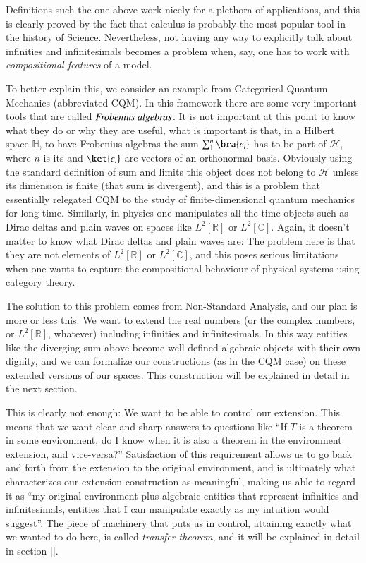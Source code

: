 \documentclass[adraft, copyright,creativecommons,sharealike,noncommercial]{eptcs}
\begin{document}
Definitions such the one above work nicely for a plethora of applications, and this is clearly proved by the fact that calculus is probably the most popular tool in the history of Science. Nevertheless, not having any way to explicitly talk about infinities and infinitesimals becomes a problem when, say, one has to work with \emph{compositional features} of a model. 

To better explain this, we consider an example from Categorical Quantum Mechanics (abbreviated CQM). In this framework there are some very important tools that are called $\emph{Frobenius algebras}$. It is not important at this point to know what they do or why they are useful, what is important is that, in a Hilbert space $\mathbb{H}$, to have Frobenius algebras the sum $\sum_1^n \bra{e_i}$ has to be part of $\mathcal{H}$, where $n$ is its and $\ket{e_i}$ are vectors of an orthonormal basis. Obviously using the standard definition of sum and limits this object does not belong to $\mathcal{H}$ unless its dimension is finite (that sum is divergent), and this is a problem that essentially relegated CQM to the study of finite-dimensional quantum mechanics for long time. Similarly, in physics one manipulates all the time objects such as Dirac deltas and plain waves on spaces like $L^2[\mathbb{R}]$ or $L^2[\mathbb{C}]$. Again, it doesn't matter to know what Dirac deltas and plain waves are: The problem here is that they are not elements of $L^2[\mathbb{R}]$ or $L^2[\mathbb{C}]$, and this poses serious limitations when one wants to capture the compositional behaviour of physical systems using category theory.

The solution to this problem comes from Non-Standard Analysis, and our plan is more or less this: We want to extend the real numbers (or the complex numbers, or $L^2[\mathbb{R}]$, whatever) including infinities and infinitesimals. In this way entities like the diverging sum above become well-defined algebraic objects with their own dignity, and we can formalize our constructions (as in the CQM case) on these extended versions of our spaces. This construction will be explained in detail in the next section.

This is clearly not enough: We want to be able to control our extension. This means that we want clear and sharp answers to questions like ``If $T$ is a theorem in some environment, do I know when it is also a theorem in the environment extension, and vice-versa?'' Satisfaction of this requirement allows us to go back and forth from the extension to the original environment, and is ultimately what characterizes our extension construction as meaningful, making us able to regard it as ``my original environment plus algebraic entities that represent infinities and infinitesimals, entities that I can manipulate exactly as my intuition would suggest''. The piece of machinery that puts us in control, attaining exactly what we wanted to do here, is called \emph{transfer theorem}, and it will be explained in detail in section []. 
\end{document}
